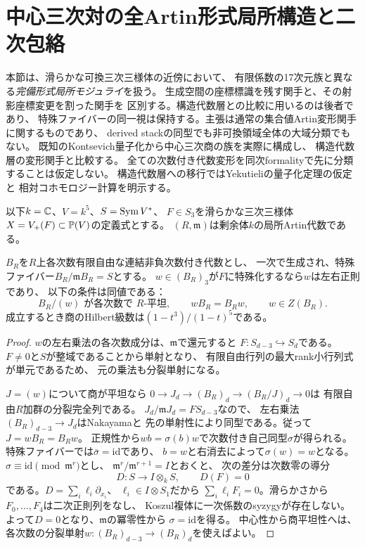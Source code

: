 \section{中心三次対の全Artin形式局所構造と二次包絡}
\label{sec:moduli-artin}
本節は、滑らかな可換三次三様体の近傍において、
有限係数の17次元族と異なる\emph{完備形式局所モジュライ}を扱う。
生成空間の座標標識を残す関手と、その射影座標変更を割った関手を
区別する。構造代数層との比較に用いるのは後者であり、
特殊ファイバーの同一視は保持する。主張は通常の集合値Artin変形関手に関するものであり、
derived stackの同型でも非可換領域全体の大域分類でもない。
既知のKontsevich量子化から中心三次商の族を実際に構成し、
構造代数層の変形関手と比較する。
全ての次数付き代数変形を同次formalityで先に分類することは仮定しない。
構造代数層への移行ではYekutieliの量子化定理の仮定と
相対コホモロジー計算を明示する。

以下$k=\mathbb C$、$V=k^5$、$S=\operatorname{Sym} V^*$、
$F\in S_3$を滑らかな三次三様体
$X=V_+(F)\subset\mathbb P(V)$の定義式とする。
$(R,\mathfrak m)$は剰余体$k$の局所Artin代数である。

\begin{lemma}[平坦な正規三次商は自動的に中心商]
\label{lem:artin-normal-central}
$B_R$を$R$上各次数有限自由な連結非負次数付き代数とし、
一次で生成され、特殊ファイバー$B_R/\mathfrak mB_R=S$とする。
$w\in(B_R)_3$が$F$に特殊化するなら$w$は左右正則であり、
以下の条件は同値である：
\[
 B_R/(w)\text{ が各次数で }R\text{-平坦},\qquad
 wB_R=B_Rw,\qquad
 w\in Z(B_R).
\]
成立するとき商のHilbert級数は$(1-t^3)/(1-t)^5$である。
\end{lemma}
\begin{proof}
$w$の左右乗法の各次数成分は、$\mathfrak m$で還元すると
$F:S_{d-3}\hookrightarrow S_d$である。
$F\ne0$と$S$が整域であることから単射となり、
有限自由行列の最大rank小行列式が単元であるため、
元の乗法も分裂単射になる。

$J=(w)$について商が平坦なら
$0\to J_d\to(B_R)_d\to(B_R/J)_d\to0$は
有限自由$R$加群の分裂完全列である。
$J_d/\mathfrak mJ_d=FS_{d-3}$なので、
左右乗法$(B_R)_{d-3}\to J_d$はNakayamaと
先の単射性により同型である。従って$J=wB_R=B_Rw$。
正規性から$wb=\sigma(b)w$で次数付き自己同型$\sigma$が得られる。
特殊ファイバーでは$\bar\sigma=\mathrm{id}$であり、
$b=w$と右消去によって$\sigma(w)=w$となる。
$\sigma\equiv\mathrm{id}\pmod{\mathfrak m^r}$とし、
$\mathfrak m^r/\mathfrak m^{r+1}=I$とおくと、
次の差分は次数零の導分
\[
 D:S\longrightarrow I\otimes_k S,\qquad
 D(F)=0
\]
である。$D=\sum_i\ell_i\partial_{x_i}$、
$\ell_i\in I\otimes S_1$だから
$\sum_i\ell_iF_i=0$。滑らかさから
$F_0,\ldots,F_4$は二次正則列をなし、
Koszul複体に一次係数のsyzygyが存在しない。
よって$D=0$となり、$\mathfrak m$の冪零性から
$\sigma=\mathrm{id}$を得る。
中心性から商平坦性へは、
各次数の分裂単射$w:(B_R)_{d-3}\to(B_R)_d$を使えばよい。
\end{proof}

